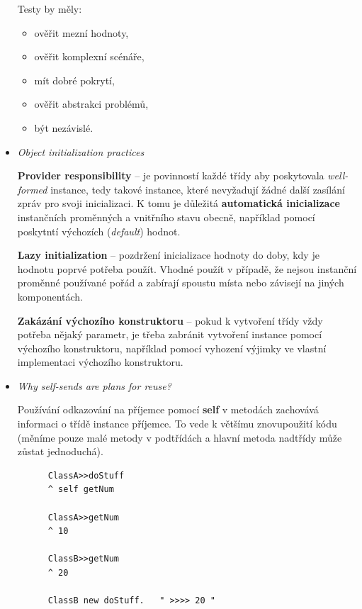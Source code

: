 \documentclass{szzclass}
\begin{document}
\begin{itemize}
      Testy by měly:

      \begin{itemize}
            \item ověřit mezní hodnoty,
            \item ověřit komplexní scénáře,
            \item mít dobré pokrytí,
            \item ověřit abstrakci problémů,
            \item být nezávislé.
      \end{itemize}

      \item \textit{Object initialization practices}
      
      \textbf{Provider responsibility} -- je povinností každé třídy aby poskytovala \textit{well-formed} instance,
      tedy takové instance, které nevyžadují žádné další zasílání zpráv pro svoji inicializaci.
      K tomu je důležitá \textbf{automatická inicializace} instančních proměnných a vnitřního stavu obecně,
      například pomocí poskytntí výchozích (\textit{default}) hodnot.

      \textbf{Lazy initialization} -- pozdržení inicializace hodnoty do doby, kdy je hodnotu poprvé potřeba použít.
      Vhodné použít v případě, že nejsou instanční proměnné používané 
      pořád a zabírají spoustu místa nebo závisejí na jiných komponentách.

      \textbf{Zakázání výchozího konstruktoru} -- pokud k vytvoření třídy vždy potřeba nějaký parametr,
      je třeba zabránit vytvoření instance pomocí výchozího konstruktoru, například pomocí vyhození výjimky
      ve vlastní implementaci výchozího konstruktoru.

      \item \textit{Why self-sends are plans for reuse?}
      
      Používání odkazování na příjemce pomocí \textbf{self} v metodách zachovává informaci o třídě instance
      příjemce. To vede k většímu znovupoužití kódu (měníme pouze malé metody v podtřídách a hlavní metoda
      nadtřídy může zůstat jednoduchá).

      \begin{verbatim}
      ClassA>>doStuff
      ^ self getNum

      ClassA>>getNum
      ^ 10

      ClassB>>getNum
      ^ 20

      ClassB new doStuff.   " >>>> 20 "
      \end{verbatim}

\end{itemize}
\end{document}
